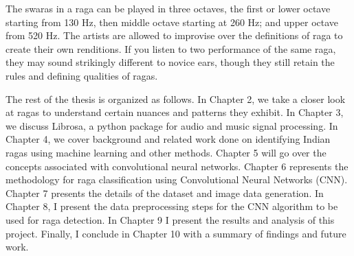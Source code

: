 The swaras in a raga can be played in three octaves, the first or lower octave starting from 130 Hz, then middle octave starting at 260 Hz; and upper octave from 520 Hz. The artists are allowed to improvise over the definitions of raga to create their own renditions. If you listen to two performance of the same raga, they may sound strikingly different to novice ears, though they still retain the rules and defining qualities of ragas. \par

The rest of the thesis is organized as follows. In Chapter 2, we take a closer look at ragas to understand certain nuances and patterns they exhibit. In Chapter 3, we discuss Librosa, a python package for audio and music signal processing. In Chapter 4, we cover background and related work done on identifying Indian ragas using machine learning and other methods. Chapter 5 will go over the concepts associated with convolutional neural networks. Chapter 6 represents the methodology for raga classification using Convolutional Neural Networks (CNN). Chapter 7 presents the details of the dataset and image data generation. In Chapter 8, I present the data preprocessing steps for the CNN algorithm to be used for raga detection. In Chapter 9 I present the results and analysis of this project. Finally, I conclude in Chapter 10 with a summary of findings and future work.  
